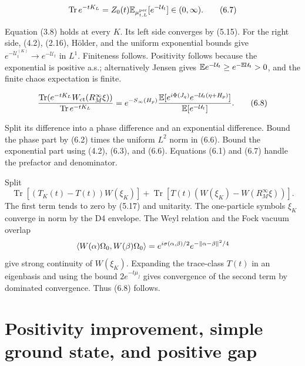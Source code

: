 \documentclass[11pt,a4paper]{article}
\newcommand{\U}{\mathcal U}
\newcommand{\Tr}{\operatorname{Tr}}
\begin{document}
\QedStep


\[
 \Tr e^{-tK_L}=Z_0(t)\E_{\mu^{\rm per}_{t,L}}[e^{-\U_t}]
 \in(0,\infty).
\tag{6.7}
\]

\Because Equation (3.8) holds at every $K$.  Its left side converges by (5.15).
For the right side, (4.2), (2.16), H\"older, and the uniform exponential bounds
give $e^{-\U_t^{(K)}}\to e^{-\U_t}$ in $L^1$.  Finiteness follows.  Positivity
follows because the exponential is positive a.s.; alternatively Jensen gives
$\E e^{-\U_t}\ge e^{-\E\U_t}>0$, and the finite chaos expectation is finite.

\[
 \frac{\Tr(e^{-tK_L}W_{\rm ct}(R_M^\infty\xi))}{\Tr e^{-tK_L}}
 =e^{-S_\infty(H_p)}
 \frac{\E[e^{i\Phi(J_q)}e^{-\U_t(\eta+H_p)}]}
 {\E[e^{-\U_t}]}.
\tag{6.8}
\]



\Because Split its difference into a phase difference and an exponential
difference.  Bound the phase part by (6.2) times the uniform $L^2$ norm in
(6.6).  Bound the exponential part using (4.2), (6.3), and (6.6).  Equations
(6.1) and (6.7) handle the prefactor and denominator.


\Because Split
\[
 \Tr[(T_K(t)-T(t))W(\xi_K)]
 +\Tr[T(t)(W(\xi_K)-W(R_M^\infty\xi))].
\]
The first term tends to zero by (5.17) and unitarity.  The one-particle symbols
$\xi_K$ converge in norm by the D4 envelope.  The Weyl relation and the Fock
vacuum overlap
\[
 \langle W(\alpha)\Omega_0,W(\beta)\Omega_0\rangle
 =e^{i\sigma(\alpha,\beta)/2}e^{-\|\alpha-\beta\|^2/4}
\]
give strong continuity of $W(\xi_K)$.  Expanding the trace-class $T(t)$ in an
eigenbasis and using the bound $2e^{-t\mu_j}$ gives convergence of the second
term by dominated convergence.  Thus (6.8) follows.

\QedStep

\section{Positivity improvement, simple ground state, and positive gap}
\end{document}
